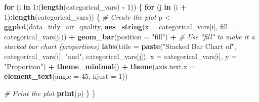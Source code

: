 \documentclass[
]{article}
\newenvironment{Shaded}{\begin{snugshade}}{\end{snugshade}}
\newcommand{\AttributeTok}[1]{\textcolor[rgb]{0.13,0.29,0.53}{#1}}
\newcommand{\CommentTok}[1]{\textcolor[rgb]{0.56,0.35,0.01}{\textit{#1}}}
\newcommand{\ControlFlowTok}[1]{\textcolor[rgb]{0.13,0.29,0.53}{\textbf{#1}}}
\newcommand{\DecValTok}[1]{\textcolor[rgb]{0.00,0.00,0.81}{#1}}
\newcommand{\FunctionTok}[1]{\textcolor[rgb]{0.13,0.29,0.53}{\textbf{#1}}}
\newcommand{\NormalTok}[1]{#1}
\newcommand{\OtherTok}[1]{\textcolor[rgb]{0.56,0.35,0.01}{#1}}
\newcommand{\SpecialCharTok}[1]{\textcolor[rgb]{0.81,0.36,0.00}{\textbf{#1}}}
\newcommand{\StringTok}[1]{\textcolor[rgb]{0.31,0.60,0.02}{#1}}
\begin{document}
\begin{Shaded}
\begin{Highlighting}[]
\ControlFlowTok{for}\NormalTok{ (i }\ControlFlowTok{in} \DecValTok{1}\SpecialCharTok{:}\NormalTok{(}\FunctionTok{length}\NormalTok{(categorical\_vars) }\SpecialCharTok{{-}} \DecValTok{1}\NormalTok{)) \{}
  \ControlFlowTok{for}\NormalTok{ (j }\ControlFlowTok{in}\NormalTok{ (i }\SpecialCharTok{+} \DecValTok{1}\NormalTok{)}\SpecialCharTok{:}\FunctionTok{length}\NormalTok{(categorical\_vars)) \{}
    \CommentTok{\# Create the plot}
\NormalTok{    p }\OtherTok{\textless{}{-}} \FunctionTok{ggplot}\NormalTok{(data\_tidy\_air\_quality, }\FunctionTok{aes\_string}\NormalTok{(}\AttributeTok{x =}\NormalTok{ categorical\_vars[i], }\AttributeTok{fill =}\NormalTok{ categorical\_vars[j])) }\SpecialCharTok{+}
      \FunctionTok{geom\_bar}\NormalTok{(}\AttributeTok{position =} \StringTok{"fill"}\NormalTok{) }\SpecialCharTok{+}  \CommentTok{\# Use "fill" to make it a stacked bar chart (proportions)}
      \FunctionTok{labs}\NormalTok{(}\AttributeTok{title =} \FunctionTok{paste}\NormalTok{(}\StringTok{"Stacked Bar Chart of"}\NormalTok{, categorical\_vars[i], }\StringTok{"and"}\NormalTok{, categorical\_vars[j]),}
           \AttributeTok{x =}\NormalTok{ categorical\_vars[i],}
           \AttributeTok{y =} \StringTok{"Proportion"}\NormalTok{) }\SpecialCharTok{+}
      \FunctionTok{theme\_minimal}\NormalTok{() }\SpecialCharTok{+}
      \FunctionTok{theme}\NormalTok{(}\AttributeTok{axis.text.x =} \FunctionTok{element\_text}\NormalTok{(}\AttributeTok{angle =} \DecValTok{45}\NormalTok{, }\AttributeTok{hjust =} \DecValTok{1}\NormalTok{))}
    
    \CommentTok{\# Print the plot}
    \FunctionTok{print}\NormalTok{(p)}
\NormalTok{  \}}
\NormalTok{\}}
\end{Highlighting}
\end{Shaded}
\end{document}
